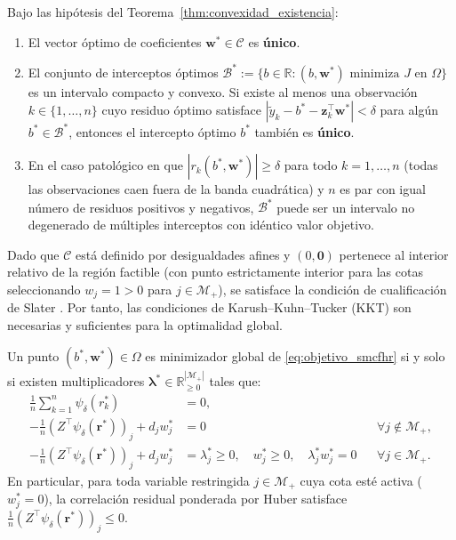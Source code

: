 \begin{theorem}\label{thm:unicidad}
Bajo las hipótesis del Teorema~\ref{thm:convexidad_existencia}:
\begin{enumerate}
    \item El vector óptimo de coeficientes $\mathbf{w}^* \in \mathcal{C}$ es \textbf{único}.
    \item El conjunto de interceptos óptimos $\mathcal{B}^* := \{b \in \mathbb{R} : (b, \mathbf{w}^*) \text{ minimiza } J \text{ en } \Omega\}$ es un intervalo compacto y convexo. Si existe al menos una observación $k \in \{1,\dots,n\}$ cuyo residuo óptimo satisface $|\tilde{y}_k - b^* - \mathbf{z}_k^\top \mathbf{w}^*| < \delta$ para algún $b^* \in \mathcal{B}^*$, entonces el intercepto óptimo $b^*$ también es \textbf{único}.
    \item En el caso patológico en que $|r_k(b^*,\mathbf{w}^*)| \ge \delta$ para todo $k=1,\dots,n$ (todas las observaciones caen fuera de la banda cuadrática) y $n$ es par con igual número de residuos positivos y negativos, $\mathcal{B}^*$ puede ser un intervalo no degenerado de múltiples interceptos con idéntico valor objetivo.
\end{enumerate}
\end{theorem}

Dado que $\mathcal{C}$ está definido por desigualdades afines y $(0, \mathbf{0})$ pertenece al interior relativo de la región factible (con punto estrictamente interior para las cotas seleccionando $w_j = 1 > 0$ para $j \in \mathcal{M}_+$), se satisface la condición de cualificación de Slater \cite{boyd2004convex}. Por tanto, las condiciones de Karush--Kuhn--Tucker (KKT) son necesarias y suficientes para la optimalidad global.

\begin{proposition}\label{prop:kkt}
Un punto $(b^*, \mathbf{w}^*) \in \Omega$ es minimizador global de \eqref{eq:objetivo_smcfhr} si y solo si existen multiplicadores $\boldsymbol{\lambda}^* \in \mathbb{R}_{\ge 0}^{|\mathcal{M}_+|}$ tales que:
\begin{align}
\frac{1}{n}\sum_{k=1}^{n} \psi_\delta(r_k^*) &= 0, \label{eq:kkt_b} \\
-\frac{1}{n}\left(Z^\top \psi_\delta(\mathbf{r}^*)\right)_j + d_j w_j^* &= 0 && \forall j \notin \mathcal{M}_+, \label{eq:kkt_free} \\
-\frac{1}{n}\left(Z^\top \psi_\delta(\mathbf{r}^*)\right)_j + d_j w_j^* &= \lambda_j^* \ge 0, \quad w_j^* \ge 0, \quad \lambda_j^* w_j^* = 0 && \forall j \in \mathcal{M}_+. \label{eq:kkt_mono}
\end{align}
En particular, para toda variable restringida $j \in \mathcal{M}_+$ cuya cota esté activa ($w_j^* = 0$), la correlación residual ponderada por Huber satisface $\frac{1}{n}(Z^\top \psi_\delta(\mathbf{r}^*))_j \le 0$.
\end{proposition}

